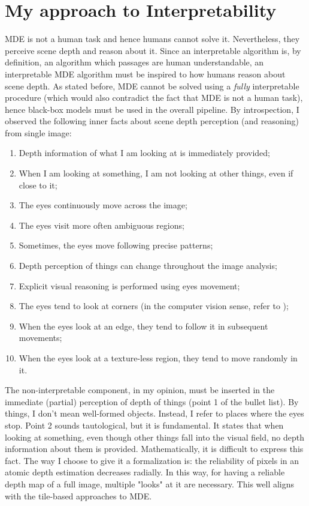 \section{My approach to Interpretability}
MDE is not a human task and hence humans cannot solve it.
Nevertheless, they perceive scene depth and reason about it.
Since an interpretable algorithm is, by definition, an algorithm which passages are human understandable, an interpretable MDE algorithm must be inspired to how humans reason about scene depth.
As stated before, MDE cannot be solved using a \textit{fully} interpretable procedure (which would also contradict the fact that MDE is not a human task), hence black-box models must be used in the overall pipeline.
By introspection, I observed the following inner facts about scene depth perception (and reasoning) from single image:
\begin{enumerate}
    \item{
        Depth information of what I am looking at is immediately provided;
    }
    \item{
        When I am looking at something, I am not looking at other things, even if close to it;
    }
    \item{
        The eyes continuously move across the image;
    }
    \item{
        The eyes visit more often ambiguous regions;
    }
    \item{
        Sometimes, the eyes move following precise patterns;
    }
    \item{
        Depth perception of things can change throughout the image analysis;
    }
    \item{
        Explicit visual reasoning is performed using eyes movement;
    }
    \item{
        The eyes tend to look at corners (in the computer vision sense, refer to \cite{computer_vision});
    }
    \item{
        When the eyes look at an edge, they tend to follow it in subsequent movements;
    }
    \item{
        When the eyes look at a texture-less region, they tend to move randomly in it.
    }
\end{enumerate}
The non-interpretable component, in my opinion, must be inserted in the immediate (partial) perception of depth of things (point 1 of the bullet list).
By things, I don't mean well-formed objects.
Instead, I refer to places where the eyes stop.
Point 2 sounds tautological, but it is fundamental.
It states that when looking at something, even though other things fall into the visual field, no depth information about them is provided.
Mathematically, it is difficult to express this fact.
The way I choose to give it a formalization is: the reliability of pixels in an atomic depth estimation decreases radially.
In this way, for having a reliable depth map of a full image, multiple "looks" at it are necessary.
This well aligns with the tile-based approaches to MDE.